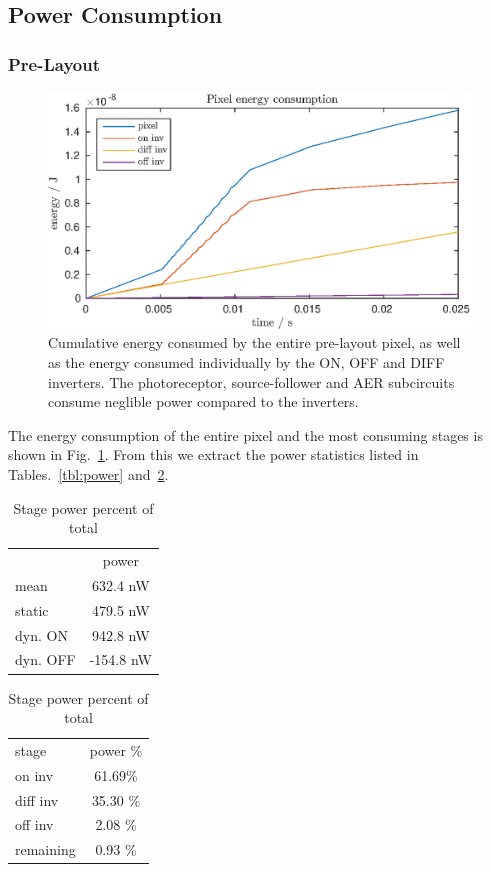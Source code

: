 \subsection{Power Consumption}
\subsubsection{Pre-Layout}
\begin{figure}
    \center
    \includegraphics{pixel-power.eps}
    \caption{Cumulative energy consumed by the entire pre-layout pixel, as well as the energy consumed individually by the 
    ON, OFF and DIFF inverters. 
    The photoreceptor, source-follower and AER subcircuits consume neglible power compared to the inverters.}
    \label{fig:pixel-energy}
\end{figure}
The energy consumption of the entire pixel and the most consuming stages is shown in Fig.~\ref{fig:pixel-energy}.
From this we extract the power statistics listed in Tables.~\ref{tbl:power} and~\ref{tbl:powerpercent}.
\begin{table}[!t]
    \begin{minipage}{0.5\textwidth}
        \center
        \caption{Static and dynamic power}
        \begin{tabular}{l | c}
            & power \\
            mean & 632.4 nW \\
            static & 479.5 nW \\
            dyn. ON & 942.8 nW \\
            dyn. OFF & -154.8 nW
        \end{tabular}
        \label{tbl:power}
    \end{minipage}
    \begin{minipage}{0.5\textwidth}
        \center
        \caption{Stage power percent of total}
        \begin{tabular}{l | c}
            stage & power \% \\
            on inv & 61.69\% \\
            diff inv & 35.30 \% \\
            off inv & 2.08 \% \\
            remaining & 0.93 \%
        \end{tabular}
        \label{tbl:powerpercent}
    \end{minipage}
\end{table}
